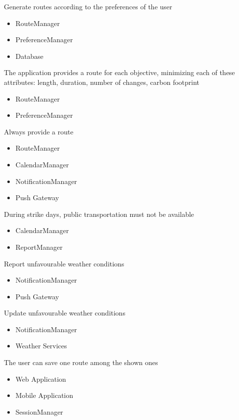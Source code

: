 \begin{itemize}
\begin{itemize}[leftmargin=1in]
 	\end{itemize}
 	\subitem[G2.3] Generate routes according to the preferences of the user
 	\begin{itemize}[leftmargin=1in]
 		\item RouteManager
 		\item PreferenceManager
 		\item Database
 	\end{itemize}
 	\subitem[G2.4] The application provides a route for each objective, minimizing each of these attributes: length, duration, number of changes, carbon footprint
 	\begin{itemize}[leftmargin=1in]
 		\item RouteManager
 		\item PreferenceManager
 	\end{itemize}
 	\subitem[G2.5] Always provide a route
 	\begin{itemize}[leftmargin=1in]
 		\item RouteManager
 		\item CalendarManager
 		\item NotificationManager
 		\item Push Gateway
 	\end{itemize}
 	\subitem[G2.6] During strike days, public transportation must not be available
 	\begin{itemize}[leftmargin=1in]
 		\item CalendarManager
 		\item ReportManager
 	\end{itemize}
 	\subitem[G2.7] Report unfavourable weather conditions
 	\begin{itemize}[leftmargin=1in]
 		\item NotificationManager
 		\item Push Gateway
 	\end{itemize}
 	\subitem[G2.8] Update unfavourable weather conditions
 	\begin{itemize}[leftmargin=1in]
 		\item NotificationManager
 		\item Weather Services
 	\end{itemize}
 	\subitem[G2.9] The user can save one route among the shown ones
 	\begin{itemize}[leftmargin=1in]
 		\item Web Application
 		\item Mobile Application
 		\item SessionManager

\end{itemize}
\end{itemize}
